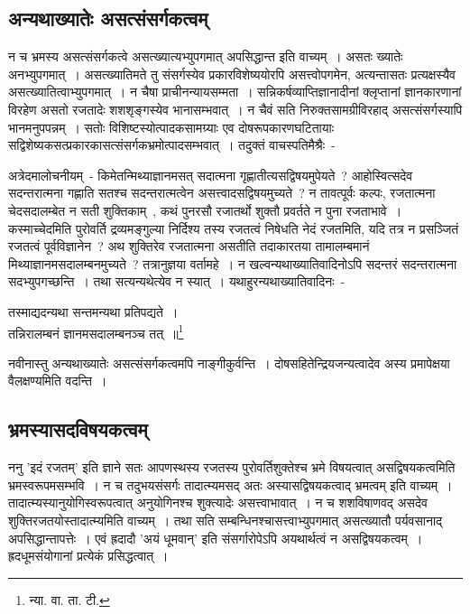 		\subsection{अन्यथाख्यातेः असत्संसर्गकत्वम्}

		न च भ्रमस्य असत्संसर्गकत्वे असत्ख्यात्यभ्युपगमात् अपसिद्धान्त इति वाच्यम्~। असतः ख्यातेः अनभ्युपगमात्~। असत्ख्यातिमते तु संसर्गस्येव प्रकारविशेष्ययोरपि असत्त्वोपगमेन, अत्यन्तासतः प्रत्यक्षस्यैव असत्ख्यातित्वाभ्युपगमात्~। न चैषा प्राचीनन्यायसम्मता~। सन्निकर्षव्याप्तिज्ञानादीनां क्लृप्तानां ज्ञानकारणानां विरहेण असतो रजतादेः शशशृङ्गस्येव भानासम्भवात्~। न चैवं सति निरुक्तसामग्रीविरहाद् असत्संसर्गस्यापि भानमनुपपन्नम्~। सतोः विशिष्टस्योत्पादकसामग्र्याः एव दोषरूपकारणघटितायाः सद्विशेष्यकसत्प्रकारकासत्संसर्गकभ्रमोत्पादसम्भवात्~। तदुक्तं वाचस्पतिमैश्रैः~-

		{\fontsize{11.7}{0}\selectfont\s अत्रेदमालोचनीयम्~- किमेतन्मिथ्याज्ञानमसत् सदात्मना गृह्णातीत्यसद्विषयमुपेयते~? आहोस्वित्सदेव सदन्तरात्मना गह्णाति सतश्च सदन्तरात्मत्वेन असत्त्वादसद्विषयमुच्यते~? न तावत्पूर्वः कल्पः, रजतात्मना चेदसदालम्बेत न सती शुक्तिकाम्~, कथं पुनरसौ रजातर्थो शुक्तौ प्रवर्तते न पुना रजताभावे~। कस्माच्चेदमिति पुरोवर्ति द्रव्यमङ्गुल्या निर्दिश्य तस्य रजतत्वं निषेधति नेदं रजतमिति, यदि तत्र न प्रसञ्जितं रजतत्वं पूर्वविज्ञानेन~? अथ शुक्तिरेव रजतात्मना असतीति तदाकारतया तामालम्बमानं मिथ्याज्ञानमसदालम्बनमुच्यते~? तत्रानुज्ञया वर्तामहे~। न खल्वन्यथाख्यातिवादिनोऽपि सदन्तरं सदन्तरात्मना सदभ्युपगच्छन्ति~। तथा सत्यन्यथेत्येव न स्यात्~। यथाहुरन्यथाख्यातिवादिनः~-\\ \begin{center}तस्माद्यदन्यथा सन्तमन्यथा प्रतिपद्यते~।\\ तन्निरालम्बनं ज्ञानमसदालम्बनञ्च तत्~॥\footnote{न्या. वा. ता. टी.}\end{center}}

		नवीनास्तु अन्यथाख्यातेः असत्संसर्गकत्वमपि नाङ्गीकुर्वन्ति~। दोषसहितेन्द्रियजन्यत्वादेव अस्य प्रमापेक्षया वैलक्षण्यमिति वदन्ति~।

		\subsection{भ्रमस्यासदविषयकत्वम्}

		ननु 'इदं रजतम्' इति ज्ञाने सतः आपणस्थस्य रजतस्य पुरोवर्तिशुक्तेश्च भ्रमे विषयत्वात् असद्विषयकत्वमिति भ्रमस्वरूपमसम्भवि~। न च तदुभयसंसर्गः तादात्म्यमसद् अतः अस्यासद्विषयकत्वाद् भ्रमत्वम् इति वाच्यम्~। तादात्म्यस्यानुयोगिस्वरूपत्वात् अनुयोगिनश्च शुक्त्यादेः असत्त्वाभावात्~। न च शशविषाणवद् असदेव शुक्तिरजतयोस्तादात्म्यमिति वाच्यम्~। तथा सति सम्बन्धिनश्चासत्त्वाभ्युपगमात् असत्ख्यातौ पर्यवसानाद् अपसिद्धान्तापत्तेः~। एवं ह्रदादौ 'अयं धूमवान्' इति संसर्गारोपेऽपि अयथार्थत्वं न असद्विषयकत्वम्~। ह्रदधूमसंयोगानां प्रत्येकं प्रसिद्धत्वात्~।

